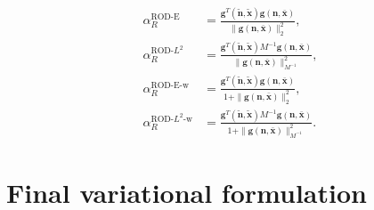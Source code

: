 \documentclass{article}
\begin{document}
\begin{subequations}
\begin{align}
\alpha_R^{\text{ROD-E}} &= \frac{\boldsymbol{g}^T(\tilde{\boldsymbol{n}},\tilde{\boldsymbol{x}}) \boldsymbol{g}(\boldsymbol{n},\bar{\boldsymbol{x}})}{\|\boldsymbol{g}(\boldsymbol{n},\bar{\boldsymbol{x}})\|_2^2}, \\[10pt]
\alpha_R^{\text{ROD-}L^2} &= \frac{\boldsymbol{g}^T(\tilde{\boldsymbol{n}},\tilde{\boldsymbol{x}}) M^{-1} \boldsymbol{g}(\boldsymbol{n},\bar{\boldsymbol{x}})}{\|\boldsymbol{g}(\boldsymbol{n},\bar{\boldsymbol{x}})\|_{M^{-1}}^2}, \\[10pt]
\alpha_R^{\text{ROD-E-w}} &= \frac{\boldsymbol{g}^T(\tilde{\boldsymbol{n}},\tilde{\boldsymbol{x}}) \boldsymbol{g}(\boldsymbol{n},\bar{\boldsymbol{x}})}{1 + \|\boldsymbol{g}(\boldsymbol{n},\bar{\boldsymbol{x}})\|_2^2}, \\[10pt]
\alpha_R^{\text{ROD-}L^2\text{-w}} &= \frac{\boldsymbol{g}^T(\tilde{\boldsymbol{n}},\tilde{\boldsymbol{x}}) M^{-1} \boldsymbol{g}(\boldsymbol{n},\bar{\boldsymbol{x}})}{1 + \|\boldsymbol{g}(\boldsymbol{n},\bar{\boldsymbol{x}})\|_{M^{-1}}^2}.
\end{align}
\end{subequations}

\section{Final variational formulation}
\end{document}
